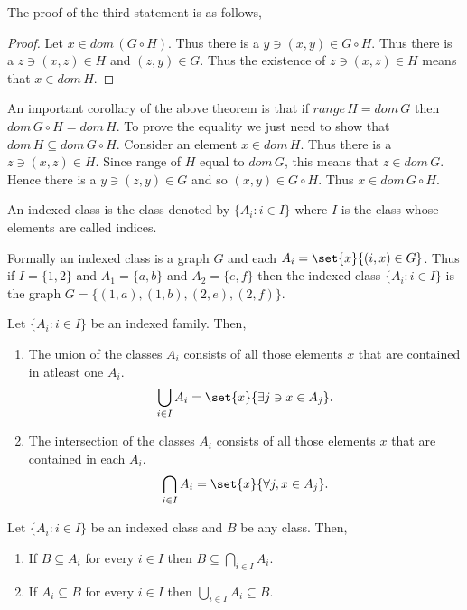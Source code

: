 The proof of the third statement is as follows,
\begin{proof}
    Let $x \in dom\,(G \circ H)$. Thus there is a $y \ni (x,y) \in G \circ H$. Thus there
    is a $z \ni (x,z) \in H$ and $(z,y) \in G$. Thus the existence of $z \ni (x,z) \in H$
    means that $x \in dom\,H$.
\end{proof}

An important corollary of the above theorem is that if $range\,H = dom\,G$ then $dom\,G\circ H =
dom\,H$. To prove the equality we just need to show that $dom\, H \subseteq dom\,G\circ H$. Consider
an element $x \in dom\,H$. Thus there is a $z \ni (x,z) \in H$. Since range of $H$ equal to
$dom\,G$, this means that $z \in dom\,G$. Hence there is a $y \ni (z,y) \in G$ and so 
$(x,y) \in G\circ H$. Thus $x \in dom\,G\circ H$.

\begin{Definition}
    An indexed class is the class denoted by $\lbrace A_i : i \in I \rbrace$ where $I$ is the class
    whose elements are called indices.
\end{Definition}
Formally an indexed class is a graph $G$ and each $A_i = \set{x}{(i,x) \in G}$. Thus if $I =
\lbrace 1,2\rbrace$ and $A_1 = \lbrace a,b \rbrace $ and $A_2 = \lbrace e , f \rbrace$ then the
indexed class $\lbrace A_i : i \in I \rbrace$ is the graph $G = \lbrace (1,a) , (1,b) , (2,e), (2,f)
\rbrace$.

\begin{Definition}
    Let $\lbrace A_i : i \in I \rbrace$ be an indexed family. Then,
    \begin{enumerate}
	\item The union of the classes $A_i$ consists of all those elements $x$ that are contained
	    in atleast one $A_i$. 
	    \begin{equation*}
		\bigcup_{i \in I} A_i = \set{x}{\exists j \ni x \in A_j}.
	    \end{equation*}
	\item The intersection of the classes $A_i$ consists of all those elements $x$ that are 
	    contained in each $A_i$. 
	    \begin{equation*}
		\bigcap_{i \in I} A_i = \set{x}{\forall j, x \in A_j}.
	    \end{equation*}
    \end{enumerate}
\end{Definition}

\begin{Theorem}
    Let $\lbrace A_i : i \in I \rbrace$ be an indexed class and $B$ be any class. Then,
    \begin{enumerate}
	\item If $B \subseteq A_i$ for every $i \in I$ then $B \subseteq \bigcap_{i \in I} A_i$.
	\item If $A_i \subseteq B$ for every $i \in I$ then $\bigcup_{i \in I} A_i \subseteq B$.
    \end{enumerate}
\end{Theorem}

